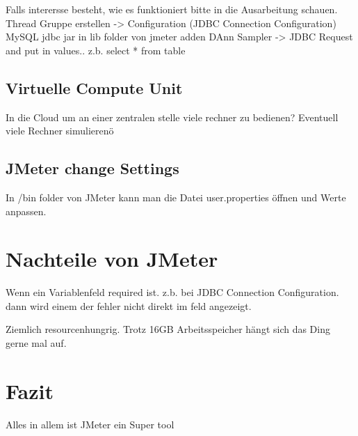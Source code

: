 \documentclass[a4paper,12pt]{article}
\begin{document}
Falls interersse besteht, wie es funktioniert bitte in die Ausarbeitung schauen.
Thread Gruppe erstellen -> Configuration (JDBC Connection Configuration)
MySQL jdbc jar in lib folder von jmeter adden 
DAnn Sampler -> JDBC Request and put in values.. z.b. select * from table


\subsection{Virtuelle Compute Unit}
In die Cloud um an einer zentralen stelle viele rechner zu bedienen?
Eventuell viele Rechner simulierenö

\subsection{JMeter change Settings}
In /bin folder von JMeter kann man die Datei user.properties öffnen und Werte anpassen.

\section{Nachteile von JMeter}
Wenn ein Variablenfeld required ist. z.b. bei JDBC Connection Configuration. dann wird einem der fehler nicht direkt im feld angezeigt.

Ziemlich resourcenhungrig. Trotz 16GB Arbeitsspeicher hängt sich das Ding gerne mal auf.
\section{Fazit}
Alles in allem ist JMeter ein Super tool

\pagebreak
\thispagestyle{empty}


\end{document}
